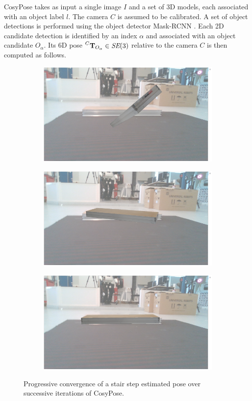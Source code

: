 CosyPose takes as input a single image $I$ and a set of 3D models, each associated with an object label $l$. The camera $C$ is assumed to be calibrated. 
A set of object detections is performed using the object detector Mask-RCNN \cite{he2018mask}. Each 2D candidate detection is identified 
by an index $\alpha$ and associated with an object candidate $O_{\alpha}$. Its 6D pose $\prescript{C}{}{{\bf T}}_{O_{\alpha}} \in \textit{SE} (3)$ relative to the camera $C$ 
is then computed as follows.

\begin{figure}[]
    \begin{subfigure}{.5\textwidth}
        \centering
        \includegraphics[width=.9\linewidth]{figures/cosyslam/convergence_1.png}  
    \end{subfigure}
    \begin{subfigure}{.5\textwidth}
        \centering
        \includegraphics[width=.9\linewidth]{figures/cosyslam/convergence_2.png}  
    \end{subfigure}

    \label{fig:fig}
    \begin{subfigure}{\textwidth}
        \centering
        \includegraphics[width=.45\linewidth]{figures/cosyslam/convergence_3.png}
    \end{subfigure}
    \caption{Progressive convergence of a stair step estimated pose over successive iterations of CosyPose.}
    \label{fig:cosypose-convergence}
\end{figure}


